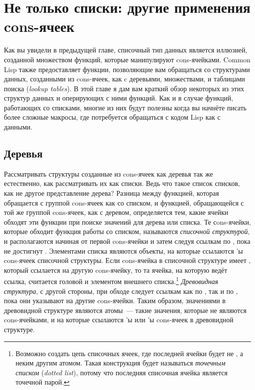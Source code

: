 \chapter{Не только списки: другие применения cons-ячеек}
\label{ch:13}

Как вы увидели в предыдущей главе, списочный тип данных является иллюзией, созданной
множеством функций, которые манипулируют cons-ячейками. Common Lisp также предоставляет
функции, позволяющие вам обращаться со структурами данных, созданными из cons-ячеек, как c
деревьями, множествами, и таблицами поиска (\textit{lookup tables}). В этой главе я дам
вам краткий обзор некоторых из этих структур данных и оперирующих с ними функций. Как и в
случае функций, работающих со списками, многие из них будут полезны когда вы начнёте
писать более сложные макросы, где потребуется обращаться с кодом Lisp как с данными.


\section{Деревья}

Рассматривать структуры созданные из cons-ячеек как деревья так же естественно, как
рассматривать их как списки. Ведь что такое список списков, как не другое представление
дерева?  Разница между функцией, которая обращается с группой cons-ячеек как со списком, и
функцией, обращающейся с той же группой cons-ячеек, как с деревом, определяется тем, какие
ячейки обходят эти функции при поиске значений для дерева или списка. Те сons-ячейки,
которые обходит функция работы со списком, называются \textit{списочной структурой}, и
располагаются начиная от первой cons-ячейки и затем следуя ссылкам по , пока не
достигнут .  Элементами списка являются объекты, на которые ссылаются
'ы cons-ячеек списочной структуры. Если cons-ячейка в списочной структуре имеет
, который ссылается на другую cons-ячейку, то та ячейка, на которую ведёт
ссылка, считается головой и элементом внешнего списка.\footnote{Возможно создать цепь
  списочных ячеек, где  последней ячейки будет не , а неким другим
  атомом. Такая конструкция будет называться \textit{точечным списком} (\textit{dotted
    list}), потому что последняя списочная ячейка является точечной парой.}
\textit{Древовидная структура}, с другой стороны, при обходе следует ссылкам как по
, так и по , пока они указывают на другие cons-ячейки. Таким образом,
значениями в древовидной структуре являются атомы~--- такие значения, которые не являются
cons-ячейками, и на которые ссылаются 'ы или 'ы cons-ячеек в
древовидной структуре.

